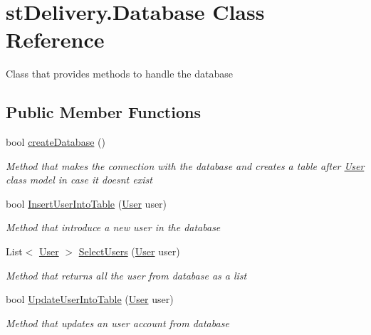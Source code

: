 \hypertarget{classst_delivery_1_1_database}{}\section{st\+Delivery.\+Database Class Reference}
\label{classst_delivery_1_1_database}


Class that provides methods to handle the database  


\subsection*{Public Member Functions}
\begin{DoxyCompactItemize}
\item 
bool \hyperlink{classst_delivery_1_1_database_a4f96c508240ac2400823813c5d39a61a}{create\+Database} ()
\begin{DoxyCompactList}\small\item\em Method that makes the connection with the database and creates a table after \hyperlink{classst_delivery_1_1_user}{User} class model in case it doesn\textquotesingle{}t exist \end{DoxyCompactList}\item 
bool \hyperlink{classst_delivery_1_1_database_ade64b128f02dcd31d50211940b5ba53c}{Insert\+User\+Into\+Table} (\hyperlink{classst_delivery_1_1_user}{User} user)
\begin{DoxyCompactList}\small\item\em Method that introduce a new user in the database \end{DoxyCompactList}\item 
List$<$ \hyperlink{classst_delivery_1_1_user}{User} $>$ \hyperlink{classst_delivery_1_1_database_ac2d2e378d6f56010d919aeb701e79f92}{Select\+Users} (\hyperlink{classst_delivery_1_1_user}{User} user)
\begin{DoxyCompactList}\small\item\em Method that returns all the user from database as a list \end{DoxyCompactList}\item 
bool \hyperlink{classst_delivery_1_1_database_a60b069ceff50d851b0ff76906c01df07}{Update\+User\+Into\+Table} (\hyperlink{classst_delivery_1_1_user}{User} user)
\begin{DoxyCompactList}\small\item\em Method that updates an user account from database \end{DoxyCompactList}\item 

\end{DoxyCompactItemize}
